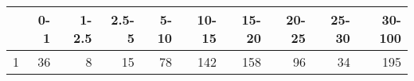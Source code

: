 \begin{table}[ht]
\centering
\begin{tabular}{rrrrrrrrrr}
  \hline
 & 0-1 & 1-2.5 & 2.5-5 & 5-10 & 10-15 & 15-20 & 20-25 & 25-30 & 30-100 \\ 
  \hline
1 &  36 &   8 &  15 &  78 & 142 & 158 &  96 &  34 & 195 \\ 
   \hline
\end{tabular}
\end{table}
